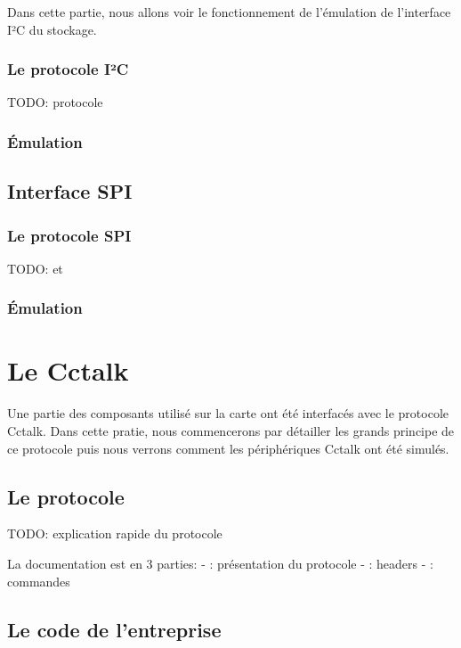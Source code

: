 \documentclass[a4paper]{article}
\begin{document}
Dans cette partie, nous allons voir le fonctionnement de l'émulation de
l'interface I²C du stockage.

\subsubsection*{Le protocole I²C}

TODO: protocole \cite{mankar2014review}

\subsubsection*{Émulation}

\subsection{Interface SPI}

\subsubsection*{Le protocole SPI}

TODO: \cite{dhaker2018introduction} et \cite{li2014design}

\subsubsection*{Émulation}

\section{Le Cctalk}

Une partie des composants utilisé sur la carte ont été interfacés avec le
protocole Cctalk. Dans cette pratie, nous commencerons par détailler les grands
principe de ce protocole puis nous verrons comment les périphériques Cctalk ont
été simulés.

\subsection{Le protocole}

TODO: explication rapide du protocole

La documentation est en 3 parties:
- \cite{cctalkpt1}: présentation du protocole
- \cite{cctalkpt2}: headers
- \cite{cctalkpt3}: commandes

\subsection{Le code de l'entreprise}
\end{document}
